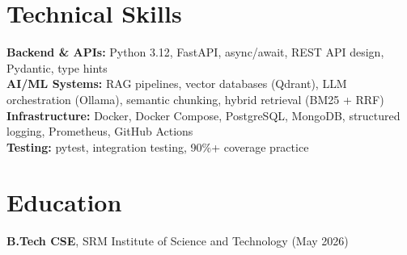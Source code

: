 \documentclass[10pt,letterpaper]{article}
\begin{document}
\section*{Technical Skills}
\textbf{Backend \& APIs:} Python 3.12, FastAPI, async/await, REST API design, Pydantic, type hints \\
\textbf{AI/ML Systems:} RAG pipelines, vector databases (Qdrant), LLM orchestration (Ollama), semantic chunking, hybrid retrieval (BM25 + RRF) \\
\textbf{Infrastructure:} Docker, Docker Compose, PostgreSQL, MongoDB, structured logging, Prometheus, GitHub Actions \\
\textbf{Testing:} pytest, integration testing, 90\%+ coverage practice

\section*{Education}
\textbf{B.Tech CSE}, SRM Institute of Science and Technology (May 2026)
\end{document}
